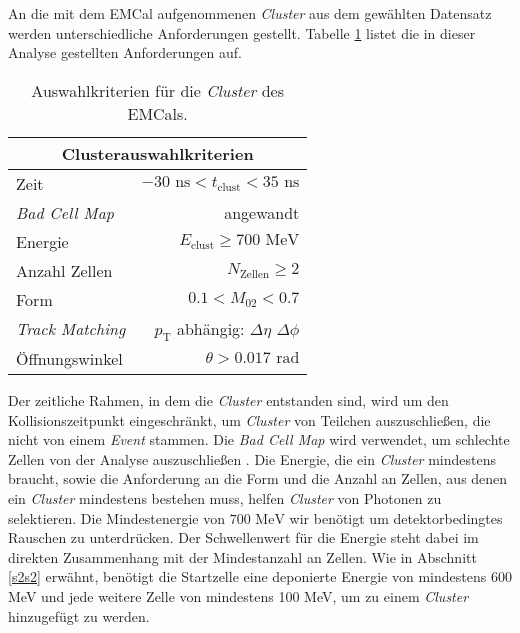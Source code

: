 An die mit dem EMCal aufgenommenen \textit{Cluster} aus dem gewählten Datensatz werden unterschiedliche Anforderungen gestellt.
Tabelle \ref{tab:Cluster} listet die in dieser Analyse gestellten Anforderungen auf.
\begin{table}[b]
\centering
\begin{tabular}{|l|r|}
\hline
\multicolumn{2}{|c|}{Clusterauswahlkriterien}                   \\ \hline \hline
Zeit                    & $-30\text{ ns} < t_\text{clust}<35\text{ ns}$ \\ \hline
\textit{Bad Cell Map}   & angewandt                                     \\ \hline
Energie                 & $E_\text{clust}\geq700\text{ MeV}$                         \\ \hline
Anzahl Zellen           & $N_\text{Zellen}\geq 2$                       \\ \hline
Form                    & $0.1< M_{02}<0.7$                             \\ \hline
\textit{Track Matching} & $p_\text{T}$ abhängig: $\Delta\eta$ $\Delta\phi$                                     \\ \hline
Öffnungswinkel          & $\theta>0.017\text{ rad}$                     \\ \hline
\end{tabular}
\caption{Auswahlkriterien für die \textit{Cluster} des EMCals.}
\label{tab:Cluster}
\end{table}
\newline
Der zeitliche Rahmen, in dem die \textit{Cluster} entstanden sind, wird um den Kollisionszeitpunkt ein\-ge\-schränkt, um \textit{Cluster} von Teilchen auszuschließen, die nicht von einem \textit{Event} stammen.
Die \textit{Bad Cell Map} wird verwendet, um schlechte Zellen von der Analyse auszuschließen \cite{thesis:Joshua}.
\newline
Die Energie, die ein \textit{Cluster} mindestens braucht, sowie die Anforderung an die Form und die Anzahl an Zellen, aus denen ein \textit{Cluster} mindestens bestehen muss, helfen \textit{Cluster} von Photonen zu selektieren.
Die Mindestenergie von $700\text{ MeV}$ wir benötigt um detektorbedingtes  Rauschen zu unterdrücken.
Der Schwellenwert für die Energie steht dabei im direkten Zusammenhang mit der Mindestanzahl an Zellen.
Wie in Abschnitt \ref{s2s2} erwähnt, benötigt die Startzelle eine deponierte Energie von mindestens 600 MeV und jede weitere Zelle von mindestens 100 MeV, um zu einem \textit{Cluster} hinzugefügt zu werden.

